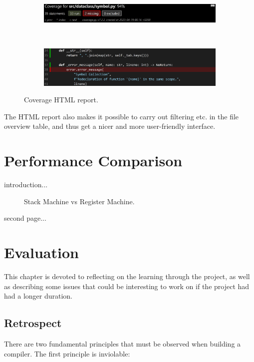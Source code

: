 \begin{figure}[H]
    \centering
    \begin{subfigure}{1\textwidth}
        \centering
        \includegraphics[width=1\textwidth]{misc/images/Coverage_Panel.png}
        \end{subfigure}\\
        \begin{subfigure}{1\textwidth}
        \centering
        \includegraphics[width=1\textwidth]{misc/images/Coverage_Info.png}
        \end{subfigure}
    \caption{Coverage HTML report.}
\end{figure}

The HTML report also makes it possible to carry out filtering etc. in the file overview table, and thus get a nicer and more user-friendly interface.

\chapter{Performance Comparison}
introduction...

\begin{figure}[H]
    \centering
    \caption{Stack Machine vs Register Machine.}
\end{figure}

\newpage

second page...


\chapter{Evaluation}
This chapter is devoted to reflecting on the learning through the project, as well as describing some issues that could be interesting to work on if the project had had a longer duration.

\section{Retrospect}
There are two fundamental principles that must be observed when building a compiler. The first principle is inviolable:

